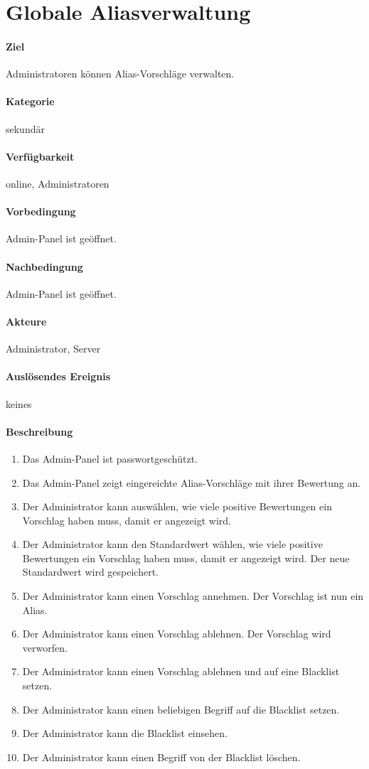 \section{Globale Aliasverwaltung}
\label{Aliasverwaltungsfunktion}
\paragraph{Ziel}
Administratoren können Alias-Vorschläge verwalten.
\paragraph{Kategorie}
sekundär
\paragraph{Verfügbarkeit}
online, Administratoren
\paragraph{Vorbedingung}
Admin-Panel ist geöffnet.
\paragraph{Nachbedingung}
Admin-Panel ist geöffnet.
\paragraph{Akteure}
Administrator, Server
\paragraph{Auslösendes Ereignis}
keines
\paragraph{Beschreibung}
\begin{enumerate}[start=100, label=\textbf{/FA\arabic*/}, align=left]
    \item Das Admin-Panel ist passwortgeschützt.
    \item Das Admin-Panel zeigt eingereichte Alias-Vorschläge mit ihrer Bewertung an.
    \item Der Administrator kann auswählen, wie viele positive Bewertungen ein Vorschlag haben muss, damit er angezeigt wird.
    \item Der Administrator kann den Standardwert wählen, wie viele positive Bewertungen ein Vorschlag haben muss, damit er angezeigt wird. Der neue Standardwert wird gespeichert.
    \item Der Administrator kann einen Vorschlag annehmen. Der Vorschlag ist nun ein Alias.
    \item Der Administrator kann einen Vorschlag ablehnen. Der Vorschlag wird verworfen.
    \item Der Administrator kann einen Vorschlag ablehnen und auf eine Blacklist setzen.
    \item Der Administrator kann einen beliebigen Begriff auf die Blacklist setzen.
    \item Der Administrator kann die Blacklist einsehen.
    \item Der Administrator kann einen Begriff von der Blacklist löschen.
\end{enumerate}